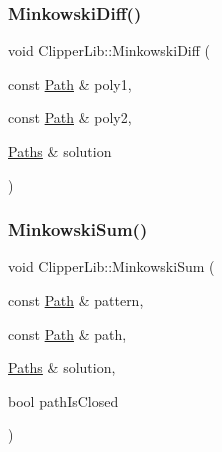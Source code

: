 \mbox{\label{namespace_clipper_lib_a76dac24102863220c7bc13be222a1dda}} 
\subsubsection{\texorpdfstring{MinkowskiDiff()}{MinkowskiDiff()}}
{\footnotesize\ttfamily void Clipper\+Lib\+::\+Minkowski\+Diff (\begin{DoxyParamCaption}\item[{const \mbox{\hyperlink{namespace_clipper_lib_af39c8fe00f278f18cc8142fef41242da}{Path}} \&}]{poly1,  }\item[{const \mbox{\hyperlink{namespace_clipper_lib_af39c8fe00f278f18cc8142fef41242da}{Path}} \&}]{poly2,  }\item[{\mbox{\hyperlink{namespace_clipper_lib_a4bab1d9e10805fa6f1fd3b78c56efcfe}{Paths}} \&}]{solution }\end{DoxyParamCaption})}

\mbox{\label{namespace_clipper_lib_ad12b5697c25579dce65d369a2e3cf608}} 
\subsubsection{\texorpdfstring{MinkowskiSum()}{MinkowskiSum()}\hspace{0.1cm}{\footnotesize\ttfamily [1/2]}}
{\footnotesize\ttfamily void Clipper\+Lib\+::\+Minkowski\+Sum (\begin{DoxyParamCaption}\item[{const \mbox{\hyperlink{namespace_clipper_lib_af39c8fe00f278f18cc8142fef41242da}{Path}} \&}]{pattern,  }\item[{const \mbox{\hyperlink{namespace_clipper_lib_af39c8fe00f278f18cc8142fef41242da}{Path}} \&}]{path,  }\item[{\mbox{\hyperlink{namespace_clipper_lib_a4bab1d9e10805fa6f1fd3b78c56efcfe}{Paths}} \&}]{solution,  }\item[{bool}]{path\+Is\+Closed }\end{DoxyParamCaption})}

\mbox{\label{namespace_clipper_lib_ae4893aa579fd7c46ce695fd3d1c66e64}} 
